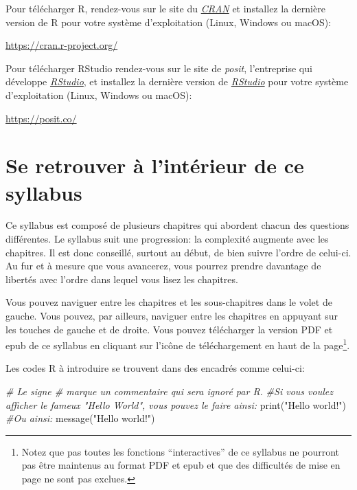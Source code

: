 \documentclass[
]{book}
\newenvironment{Shaded}{\begin{snugshade}}{\end{snugshade}}
\newcommand{\CommentTok}[1]{\textcolor[rgb]{0.56,0.35,0.01}{\textit{#1}}}
\newcommand{\FunctionTok}[1]{\textcolor[rgb]{0.00,0.00,0.00}{#1}}
\newcommand{\NormalTok}[1]{#1}
\newcommand{\StringTok}[1]{\textcolor[rgb]{0.31,0.60,0.02}{#1}}
\begin{document}
Pour télécharger R, rendez-vous sur le site du \href{https://cran.r-project.org/}{\emph{CRAN}} et installez la dernière version de R pour votre système d'exploitation (Linux, Windows ou macOS):

\url{https://cran.r-project.org/}

Pour télécharger RStudio rendez-vous sur le site de \emph{posit}, l'entreprise qui développe \href{https://posit.co/}{\emph{RStudio}}, et installez la dernière version de \href{https://posit.co/}{\emph{RStudio}} pour votre système d'exploitation (Linux, Windows ou macOS):

\url{https://posit.co/}

\hypertarget{se-retrouver-uxe0-lintuxe9rieur-de-ce-syllabus}{%
\section{Se retrouver à l'intérieur de ce syllabus}\label{se-retrouver-uxe0-lintuxe9rieur-de-ce-syllabus}}

Ce syllabus est composé de plusieurs chapitres qui abordent chacun des questions différentes. Le syllabus suit une progression: la complexité augmente avec les chapitres. Il est donc conseillé, surtout au début, de bien suivre l'ordre de celui-ci. Au fur et à mesure que vous avancerez, vous pourrez prendre davantage de libertés avec l'ordre dans lequel vous lisez les chapitres.

Vous pouvez naviguer entre les chapitres et les sous-chapitres dans le volet de gauche. Vous pouvez, par ailleurs, naviguer entre les chapitres en appuyant sur les touches de gauche et de droite. Vous pouvez télécharger la version PDF et epub de ce syllabus en cliquant sur l'icône de téléchargement en haut de la page\footnote{Notez que pas toutes les fonctions ``interactives'' de ce syllabus ne pourront pas être maintenus au format PDF et epub et que des difficultés de mise en page ne sont pas exclues.}.

Les codes R à introduire se trouvent dans des encadrés comme celui-ci:

\begin{Shaded}
\begin{Highlighting}[]
\CommentTok{\# Le signe \# marque un commentaire qui sera ignoré par R.}
\CommentTok{\#Si vous voulez afficher le fameux "Hello World", vous pouvez le faire ainsi:}
\FunctionTok{print}\NormalTok{(}\StringTok{"Hello world!"}\NormalTok{)}
\CommentTok{\#Ou ainsi:}
\FunctionTok{message}\NormalTok{(}\StringTok{"Hello world!"}\NormalTok{)}
\end{Highlighting}
\end{Shaded}
\end{document}
